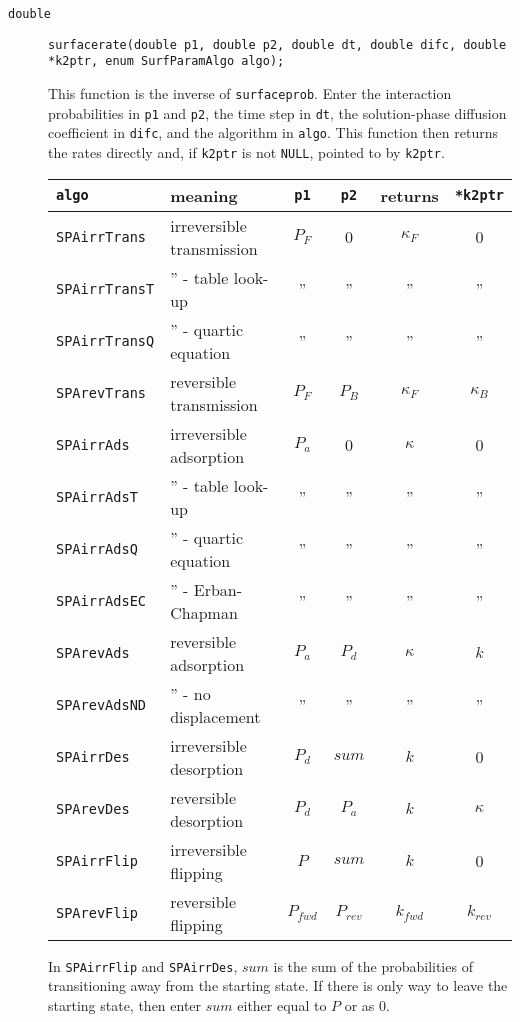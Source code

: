 \documentclass[11pt]{article}
\newcommand {\ttt} {\texttt}
\begin{document}
\begin{description}
\item[\ttt{double}]
\ttt{surfacerate(double p1, double p2, double dt, double difc, double *k2ptr, enum SurfParamAlgo algo);}

This function is the inverse of \ttt{surfaceprob}. Enter the interaction probabilities in \ttt{p1} and \ttt{p2}, the time step in \ttt{dt}, the solution-phase diffusion coefficient in \ttt{difc}, and the algorithm in \ttt{algo}. This function then returns the rates directly and, if \ttt{k2ptr} is not \ttt{NULL}, pointed to by \ttt{k2ptr}.

\begin{longtable}[c]{llcccc}
\ttt{algo} & meaning & \ttt{p1} & \ttt{p2} & returns & \ttt{*k2ptr} \\
\hline
\ttt{SPAirrTrans} & irreversible transmission & $P_F$ & 0 & $\kappa_F$ & 0\\
\ttt{SPAirrTransT} & '' - table look-up & '' & '' & '' & '' \\
\ttt{SPAirrTransQ} & '' - quartic equation & '' & '' & '' & '' \\
\ttt{SPArevTrans} & reversible transmission & $P_F$ & $P_B$ & $\kappa_F$ & $\kappa_B$ \\
\ttt{SPAirrAds} & irreversible adsorption & $P_a$ & 0 & $\kappa$ & 0\\
\ttt{SPAirrAdsT} & '' - table look-up & '' & '' & '' & ''\\
\ttt{SPAirrAdsQ} & '' - quartic equation & '' & '' & '' & ''\\
\ttt{SPAirrAdsEC} & '' - Erban-Chapman & '' & '' & '' & ''\\
\ttt{SPArevAds} & reversible adsorption & $P_a$ & $P_d$ & $\kappa$ & $k$\\
\ttt{SPArevAdsND} & '' - no displacement & '' & '' & '' & ''\\
\ttt{SPAirrDes} & irreversible desorption & $P_d$ & $sum$ & $k$ & 0\\
\ttt{SPArevDes} & reversible desorption & $P_d$ & $P_a$ & $k$ & $\kappa$ \\
\ttt{SPAirrFlip} & irreversible flipping & $P$ & $sum$ & $k$ & 0\\
\ttt{SPArevFlip} & reversible flipping & $P_{fwd}$ & $P_{rev}$ & $k_{fwd}$ & $k_{rev}$
\end{longtable}

In \ttt{SPAirrFlip} and \ttt{SPAirrDes}, $sum$ is the sum of the probabilities of transitioning away from the starting state. If there is only way to leave the starting state, then enter $sum$ either equal to $P$ or as 0.



\end{description}
\end{document}
